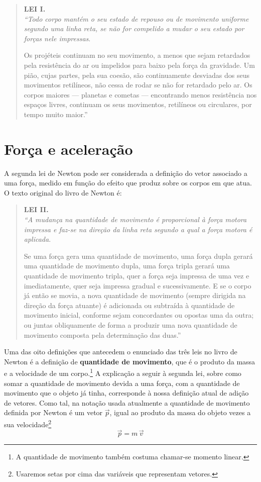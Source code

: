 \documentclass[a4paper,12pt,twosided]{report}
\begin{document}
\begin{quotation}
\noindent\textbf{LEI I.}\\
\emph{``Todo corpo mantém o seu estado de repouso ou de
movimento uniforme segundo uma linha reta, se não for compelido a mudar o
seu estado por forças nele impressas}.

Os projéteis continuam no seu movimento, a menos
que sejam retardados pela resistência do ar ou impelidos para baixo pela
força da gravidade. Um pião, cujas partes, pela sua coesão, são
continuamente desviadas dos seus movimentos retilíneos, não cessa de
rodar se não for retardado pelo ar. Os corpos maiores --- planetas e
cometas --- encontrando menos resistência nos espaços livres, continuam
os seus movimentos, retilíneos ou circulares, por tempo muito maior.''
\end{quotation}

\section{Força e aceleração}

A segunda lei de Newton pode ser considerada a definição do vetor
associado a uma força, medido em função do efeito que produz sobre os
corpos em que atua. O texto original do livro de Newton é:

\begin{quotation}
\noindent\textbf{LEI II.}\\
\emph{``A mudança na quantidade de movimento é proporcional à força
motora impressa e faz-se na direção da linha reta segundo a qual a força
motora é aplicada}.

Se uma força gera uma quantidade de movimento, uma força dupla gerará
uma quantidade de movimento dupla, uma força tripla gerará uma quantidade
de movimento tripla, quer a força seja impressa de uma vez e
imediatamente, quer seja impressa gradual e sucessivamente. E se o corpo
já então se movia, a nova quantidade de movimento (sempre dirigida na
direção da força atuante) é adicionada ou subtraída à quantidade de
movimento inicial, conforme sejam concordantes ou opostas uma da outra; ou
juntas obliquamente de forma a produzir uma nova quantidade de movimento
composta pela determinação das duas.''
\end{quotation}

Uma das oito definições que antecedem o enunciado das três leis no
livro de Newton é a definição de \textbf{quantidade de movimento}, que
é o produto da massa e a velocidade de um corpo.\footnote{A quantidade de
movimento também costuma chamar-se momento linear.} A explicação a
seguir à segunda lei, sobre como somar a quantidade de movimento
devida a uma força, com a quantidade de movimento que o objeto já
tinha, corresponde à nossa definição atual de adição de vetores. Como
tal, na notação usada atualmente a quantidade de movimento definida
por Newton é um vetor $\vec{p}$, igual ao produto da massa do objeto
vezes a sua velocidade\footnote{Usaremos setas por cima das variáveis que
  representam vetores.}
\begin{equation}
\vec{p} = m\,\vec{v}
\end{equation}
\end{document}
